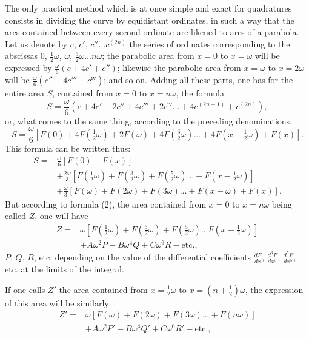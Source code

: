 \documentclass{article}
\begin{document}
The only practical method which is at once simple and exact for quadratures consists in dividing the curve by equidistant ordinates, in such a way that the arcs contained between every second ordinate are likened to arcs of a parabola. Let us denote by $c$, $c'$, $c''\ldots c^{(2n)}$ the series of ordinates corresponding to the abscissas $0$, $\frac{1}{2}\omega$, $\omega$, $\frac{3}{2}\omega\ldots n\omega$; the parabolic area from $x=0$ to $x=\omega$ will be expressed by $\frac{\omega}{6}(c+4c'+c'')$; likewise the parabolic area from $x=\omega$ to $x=2\omega$ will be $\frac{\omega}{6}(c''+4c'''+c^{\text{iv}})$; and so on. Adding all these parts, one has for the entire area $S$, contained from $x=0$ to $x=n\omega$, the formula
\[ S=\frac{\omega}{6}(c+4c'+2c''+4c'''+2c^{\text{iv}}\ldots+4c^{(2n-1)}+c^{(2n)}), \tag{3} \]
or, what comes to the same thing, according to the preceding denominations,
\[ S=\frac{\omega}{6}[F(0)+4F(\tfrac{1}{2}\omega)+2F(\omega)+4F(\tfrac{3}{2}\omega)\ldots+4F(x-\tfrac{1}{2}\omega)+F(x)]. \]
This formula can be written thus:
\[ \begin{aligned} S={}&\frac{\omega}{6}[F(0)-F(x)]\\ &+\frac{2\omega}{3}[F(\tfrac{1}{2}\omega)+F(\tfrac{3}{2}\omega)+F(\tfrac{5}{2}\omega)\ldots+F(x-\tfrac{1}{2}\omega)]\\ &+\frac{\omega}{3}[F(\omega)+F(2\omega)+F(3\omega)\ldots+F(x-\omega)+F(x)]. \end{aligned} \]
But according to formula (2), the area contained from $x=0$ to $x=n\omega$ being called $Z$, one will have
\[ \begin{aligned} Z={}&\omega[F(\tfrac{1}{2}\omega)+F(\tfrac{3}{2}\omega)+F(\tfrac{5}{2}\omega)\ldots F(x-\tfrac{1}{2}\omega)]\\ &+A\omega^{2}P-B\omega^{4}Q+C\omega^{6}R-\text{etc.}, \end{aligned} \]
$P$, $Q$, $R$, etc. depending on the value of the differential coefficients $\frac{dF}{dx}$, $\frac{d^{3}F}{dx^{3}}$, $\frac{d^{5}F}{dx^{5}}$, etc. at the limits of the integral.

If one calls $Z'$ the area contained from $x=\frac{1}{2}\omega$ to $x=(n+\frac{1}{2})\omega$, the expression of this area will be similarly
\[ \begin{aligned} Z'={}&\omega[F(\omega)+F(2\omega)+F(3\omega)\ldots+F(n\omega)]\\ &+A\omega^{2}P'-B\omega^{4}Q'+C\omega^{6}R'-\text{etc.}, \end{aligned} \]
\end{document}
